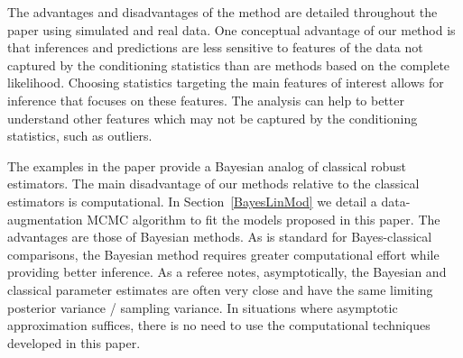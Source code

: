 \documentclass[ba]{imsart}
\newcommand{\response}[1]{{\color{blue}#1}}
\begin{document}
The advantages and disadvantages of the method are detailed throughout the paper using simulated and real data. One conceptual advantage of our method is that inferences and predictions are less sensitive to features of the data not captured by
the conditioning statistics than are methods based on the complete likelihood. Choosing statistics targeting the main features of interest allows for inference that focuses on these features. The analysis can help to better understand other features which may not be captured by the conditioning statistics, such as outliers.

The examples in the paper provide a Bayesian analog of classical robust estimators.  The main disadvantage of our methods relative to the classical estimators is computational.  In Section~\ref{BayesLinMod} we detail a data-augmentation MCMC algorithm to fit the models proposed in this paper.  The advantages are those of Bayesian methods.  As is standard for Bayes-classical comparisons, the Bayesian method requires greater computational effort while providing better inference.  As a referee notes, asymptotically, the Bayesian and classical parameter estimates are often very close and have the same limiting posterior variance / sampling variance.  In situations where asymptotic approximation suffices, there is no need to use the computational techniques developed in this paper.
\end{document}
